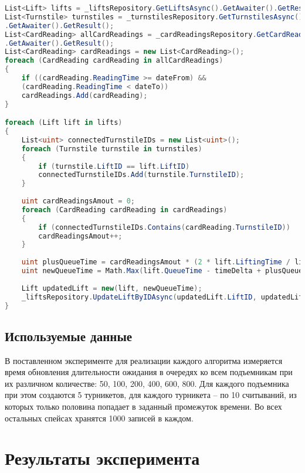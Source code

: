 \captionsetup{justification=centering,singlelinecheck=off}
\begin{lstlisting}[label=lst:upd4, caption=Четвертый алгоритм обновления времени ожидания в очередях к подъемникам, language=csharp]
    List<Lift> lifts = _liftsRepository.GetLiftsAsync().GetAwaiter().GetResult();
List<Turnstile> turnstiles = _turnstilesRepository.GetTurnstilesAsync()
.GetAwaiter().GetResult();
List<CardReading> allCardReadings = _cardReadingsRepository.GetCardReadingsAsync()
.GetAwaiter().GetResult();
List<CardReading> cardReadings = new List<CardReading>();
foreach (CardReading cardReading in allCardReadings)
{
	if ((cardReading.ReadingTime >= dateFrom) &&
	(cardReading.ReadingTime < dateTo))
	cardReadings.Add(cardReading);
}

foreach (Lift lift in lifts)
{
	List<uint> connectedTurnstileIDs = new List<uint>();
	foreach (Turnstile turnstile in turnstiles)
	{
		if (turnstile.LiftID == lift.LiftID)
		connectedTurnstileIDs.Add(turnstile.TurnstileID);
	}
	
	uint cardReadingsAmout = 0;
	foreach (CardReading cardReading in cardReadings)
	{
		if (connectedTurnstileIDs.Contains(cardReading.TurnstileID))
		cardReadingsAmout++;
	}
	
	uint plusQueueTime = cardReadingsAmout * (2 * lift.LiftingTime / lift.SeatsAmount);
	uint newQueueTime = Math.Max(lift.QueueTime - timeDelta + plusQueueTime, 0);
	
	Lift updatedLift = new(lift, newQueueTime);
	_liftsRepository.UpdateLiftByIDAsync(updatedLift.LiftID, updatedLift.LiftName, updatedLift.IsOpen, updatedLift.SeatsAmount, updatedLift.LiftingTime).GetAwaiter().GetResult();
}
\end{lstlisting}

\subsection{Используемые данные}

В поставленном эксперименте для реализации каждого алгоритма измеряется время обновления длительности ожидания в очередях ко всем подъемникам при их различном количестве: 50, 100, 200, 400, 600, 800. Для каждого подъемника при этом создаются 5 турникетов,  для каждого турникета -- по 10 считываний, из которых только половина попадает в заданный промежуток времени. Во всех остальных спейсах хранятся 1000 записей в каждом.



\section{Результаты эксперимента}

